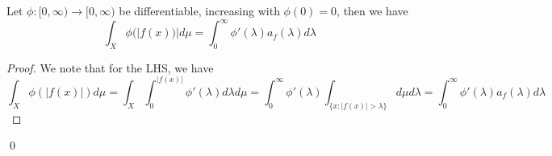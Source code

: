 \begin{proposition}
    Let $\phi:[0,\infty)\to [0,\infty)$ be differentiable, increasing with $\phi(0)=0$, then we have
    \begin{equation*}
        \int_X\phi(|f(x))|d\mu=\int_0^\infty\phi'(\lambda)a_f(\lambda) d\lambda
    \end{equation*}
\end{proposition}
\begin{proof}
    We note that for the LHS, we have
    \begin{equation*}
        \int_X\phi(|f(x)|)d\mu=\int_X\int_0^{|f(x)|}\phi'(\lambda)d\lambda d\mu=\int_0^\infty\phi'(\lambda)\int_{\{x:|f(x)|>\lambda\}}d\mu d\lambda=\int_0^\infty\phi'(\lambda)a_f(\lambda)d\lambda
    \end{equation*}
\end{proof}
\qed


